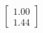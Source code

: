 \documentclass[preview]{standalone}
\begin{document}
\begin{align*}
\begin{bmatrix} 1.00 \\ 1.44 \end{bmatrix}
\end{align*}
\end{document}
